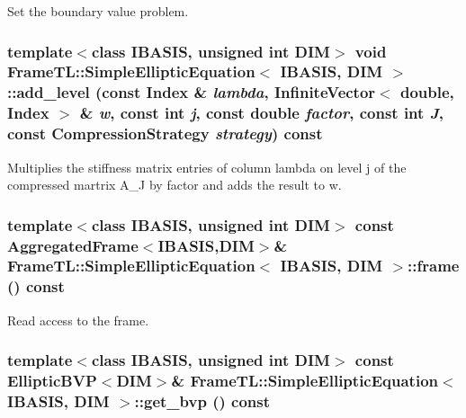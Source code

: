 Set the boundary value problem. \hypertarget{classFrameTL_1_1SimpleEllipticEquation_c21526eb37390ef77b7130e20c6ae000}{
\subsubsection[add\_\-level]{\setlength{\rightskip}{0pt plus 5cm}template$<$class IBASIS, unsigned int DIM$>$ void {\bf FrameTL::SimpleEllipticEquation}$<$ IBASIS, DIM $>$::add\_\-level (const {\bf Index} \& {\em lambda}, \/  InfiniteVector$<$ double, {\bf Index} $>$ \& {\em w}, \/  const int {\em j}, \/  const double {\em factor}, \/  const int {\em J}, \/  const CompressionStrategy {\em strategy}) const}}
\label{classFrameTL_1_1SimpleEllipticEquation_c21526eb37390ef77b7130e20c6ae000}


Multiplies the stiffness matrix entries of column lambda on level j of the compressed martrix A\_\-J by factor and adds the result to w. \hypertarget{classFrameTL_1_1SimpleEllipticEquation_21d88cf95981a8f5c3187c7339491b41}{
\subsubsection[frame]{\setlength{\rightskip}{0pt plus 5cm}template$<$class IBASIS, unsigned int DIM$>$ const {\bf AggregatedFrame}$<$IBASIS,DIM$>$\& {\bf FrameTL::SimpleEllipticEquation}$<$ IBASIS, DIM $>$::frame () const}}
\label{classFrameTL_1_1SimpleEllipticEquation_21d88cf95981a8f5c3187c7339491b41}


Read access to the frame. \hypertarget{classFrameTL_1_1SimpleEllipticEquation_d1559772cff60c00487587b4a160a60f}{
\subsubsection[get\_\-bvp]{\setlength{\rightskip}{0pt plus 5cm}template$<$class IBASIS, unsigned int DIM$>$ const EllipticBVP$<$DIM$>$\& {\bf FrameTL::SimpleEllipticEquation}$<$ IBASIS, DIM $>$::get\_\-bvp () const}}
\label{classFrameTL_1_1SimpleEllipticEquation_d1559772cff60c00487587b4a160a60f}


